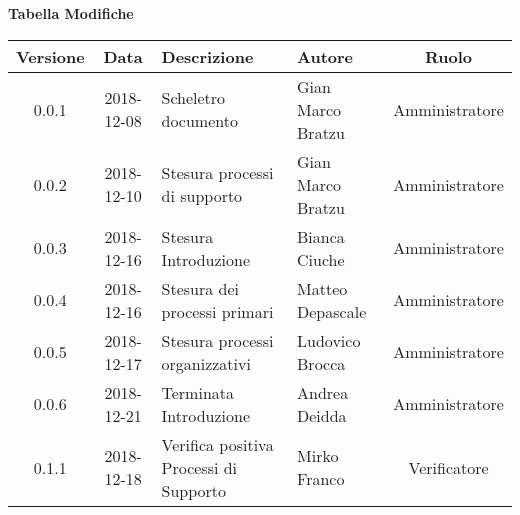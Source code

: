 \begin{center}
	\textbf{Tabella Modifiche}
	\end{center}
	\begin{center}
		\begin{tabularx}{\textwidth}{|c|c|X|X|c|}
			\hline
			\textbf{Versione} & \textbf{Data} & \textbf{Descrizione} & \textbf{Autore} & \textbf{Ruolo} \\
			\hline
			0.0.1 & 2018-12-08 & Scheletro documento  & Gian Marco Bratzu & Amministratore\\
			\hline
			0.0.2 & 2018-12-10 & Stesura processi di supporto & Gian Marco Bratzu & Amministratore\\	
			\hline
			0.0.3 & 2018-12-16 & Stesura Introduzione & Bianca Ciuche & Amministratore\\
			\hline
			0.0.4 & 2018-12-16 & Stesura dei processi primari & Matteo Depascale & Amministratore\\
			\hline
			0.0.5 & 2018-12-17 & Stesura processi organizzativi & Ludovico Brocca & Amministratore\\
			\hline
			0.0.6 & 2018-12-21 & Terminata Introduzione & Andrea Deidda & Amministratore\\
			\hline
			0.1.1 & 2018-12-18 & Verifica positiva Processi di Supporto & Mirko Franco & Verificatore\\
			\hline
		\end{tabularx}
	\end{center}

\newpage